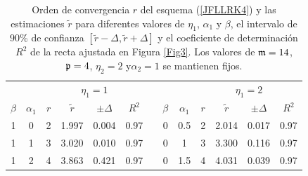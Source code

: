\vspace{0.3cm}

\begin{table}[htb]
	\centering
	\caption{
        Orden de convergencia $r$ del esquema (\ref{JFLLRK4}) y las estimaciones $\widetilde{r}$ para diferentes valores de  $\eta_1$, $\alpha_1$ y $\beta$, el intervalo de $90\%$ de confianza $[\widetilde{r}-\varDelta,\widetilde{r}+\varDelta]$ y el coeficiente de determinación $R^2$ de la recta ajustada en Figura \ref{Fig3}. Los valores de $\mathfrak{m}=14$, $\mathfrak{p}=4$, $\eta_2=2$ y$\alpha_2=1$ se mantienen fijos.}
	\begin{adjustbox}{width=0.8\columnwidth,center}
		\begin{tabular}{ccccccccccccc}
			\hline
			&  & \multicolumn{4}{c}{$\eta _{1}=1$} &  &  &  & \multicolumn{4}{c}{$\eta
				_{1}=2$} \\ \cline{3-6}\cline{10-13}
			$\beta $ & $\alpha _{1}$ & $r$ & $\widetilde{r}$ & $\pm \varDelta$ & $R^{2}$
			&  & $\beta $ & $\alpha _{1}$ & $r$ & $\widetilde{r}$ & $\pm \varDelta$ & $%
			R^{2}$ \\ \hline
			1 & 0 & 2 & 1.997 & 0.004 & 0.97 &  & 0 & 0.5 & 2 & 2.014 & 0.017 & 0.97 \\ 
			1 & 1 & 3 & 3.020 & 0.010 & 0.97 &  & 0 & 1 & 3 & 3.300 & 0.116 & 0.97 \\ 
			1 & 2 & 4 & 3.863 & 0.421 & 0.97 &  & 0 & 1.5 & 4 & 4.031 & 0.039 & 0.97 \\ 
			\hline
		\end{tabular}
	\end{adjustbox}
	\label{tab:in}
\end{table}

\vspace{0.5cm}


